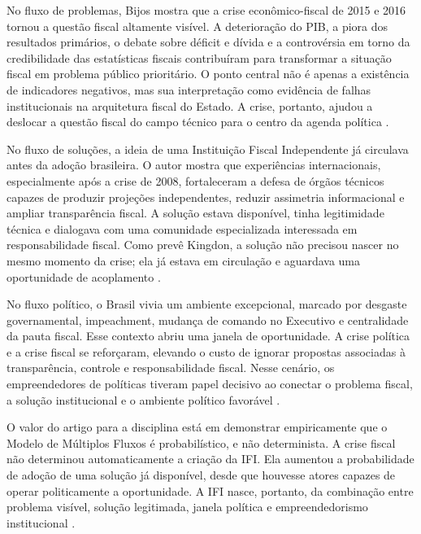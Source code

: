 \documentclass[12pt,a4paper]{article}
\begin{document}
No fluxo de problemas, Bijos mostra que a crise econômico-fiscal de 2015 e 2016 tornou a questão fiscal altamente visível. A deterioração do PIB, a piora dos resultados primários, o debate sobre déficit e dívida e a controvérsia em torno da credibilidade das estatísticas fiscais contribuíram para transformar a situação fiscal em problema público prioritário. O ponto central não é apenas a existência de indicadores negativos, mas sua interpretação como evidência de falhas institucionais na arquitetura fiscal do Estado. A crise, portanto, ajudou a deslocar a questão fiscal do campo técnico para o centro da agenda política \autocite{bijos2024ifi}.

No fluxo de soluções, a ideia de uma Instituição Fiscal Independente já circulava antes da adoção brasileira. O autor mostra que experiências internacionais, especialmente após a crise de 2008, fortaleceram a defesa de órgãos técnicos capazes de produzir projeções independentes, reduzir assimetria informacional e ampliar transparência fiscal. A solução estava disponível, tinha legitimidade técnica e dialogava com uma comunidade especializada interessada em responsabilidade fiscal. Como prevê Kingdon, a solução não precisou nascer no mesmo momento da crise; ela já estava em circulação e aguardava uma oportunidade de acoplamento \autocites{kingdon2003agendas}[][]{bijos2024ifi}.

No fluxo político, o Brasil vivia um ambiente excepcional, marcado por desgaste governamental, impeachment, mudança de comando no Executivo e centralidade da pauta fiscal. Esse contexto abriu uma janela de oportunidade. A crise política e a crise fiscal se reforçaram, elevando o custo de ignorar propostas associadas à transparência, controle e responsabilidade fiscal. Nesse cenário, os empreendedores de políticas tiveram papel decisivo ao conectar o problema fiscal, a solução institucional e o ambiente político favorável \autocites{capella2022multiplos}[][]{bijos2024ifi}.

O valor do artigo para a disciplina está em demonstrar empiricamente que o Modelo de Múltiplos Fluxos é probabilístico, e não determinista. A crise fiscal não determinou automaticamente a criação da IFI. Ela aumentou a probabilidade de adoção de uma solução já disponível, desde que houvesse atores capazes de operar politicamente a oportunidade. A IFI nasce, portanto, da combinação entre problema visível, solução legitimada, janela política e empreendedorismo institucional \autocites{kingdon2003agendas}[][]{bijos2024ifi}.
\end{document}
